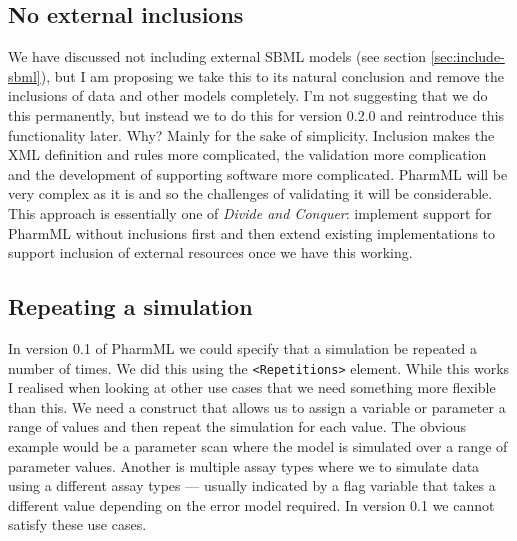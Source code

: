 \documentclass[a4paper,10pt]{article}
\newcommand{\pharmml}{PharmML\xspace}
\newcommand{\xelem}[1]{\texttt{<#1>}\index{XML Element!\texttt{<#1>}}}
\begin{document}
\subsection{No external inclusions}
\label{sec:no-ext-res}

We have discussed not including external SBML models (see section
\ref{sec:include-sbml}), but I am proposing we take this to its
natural conclusion and remove the inclusions of data and other models
completely. I'm not suggesting that we do this permanently, but
instead we to do this for version 0.2.0 and reintroduce this
functionality later. Why?  Mainly for the sake of
simplicity. Inclusion makes the XML definition and rules more
complicated, the validation more complication and the development of
supporting software more complicated. \pharmml will be very
complex as it is and so the challenges of validating it will be
considerable. This approach is essentially one of \emph{Divide and
  Conquer}: implement support for \pharmml without inclusions first
and then extend existing implementations to support inclusion of
external resources once we have this working.

\subsection{Repeating a simulation}

In version 0.1 of \pharmml we could specify that a simulation be
repeated a number of times. We did this using the \xelem{Repetitions}
element. While this works I realised when looking at other use cases
that we need something more flexible than this. We need a construct
that allows us to assign a variable or parameter a range of values and
then repeat the simulation for each value. The obvious example would
be a parameter scan where the model is simulated over a range of
parameter values. Another is multiple assay types where we to simulate
data using a different assay types --- usually indicated by a flag
variable that takes a different value depending on the error model
required. In version 0.1 we cannot satisfy these use cases.
\end{document}
